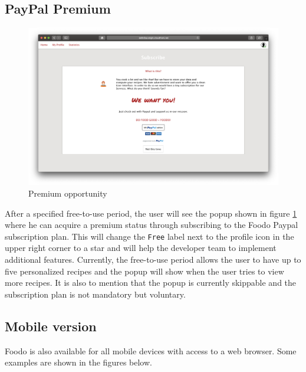 \subsection*{PayPal Premium}
\vspace{0.5em}
\begin{figure}[H]
	\captionsetup{justification=centering}
	\begin{center}
		\includegraphics[scale=0.25]{Ressourcen/img/screenshots/screenshotR.png}
		\vspace{-2em}
		\caption{Premium opportunity}
		\label{fig:paypal}
	\end{center}
\end{figure}
After a specified free-to-use period, the user will see the popup shown in figure \ref{fig:paypal} where he can acquire a premium status through subscribing to the Foodo Paypal subscription plan. This will change the \texttt{Free} label next to the profile icon in the upper right corner to a star and will help the developer team to implement additional features. Currently, the free-to-use period allows the user to have up to five personalized recipes and the popup will show when the user tries to view more recipes. It is also to mention that the popup is currently skippable and the subscription plan is not mandatory but voluntary.  
\clearpage
\subsection*{Mobile version}
Foodo is also available for all mobile devices with access to a web browser. Some examples are shown in the figures below.

